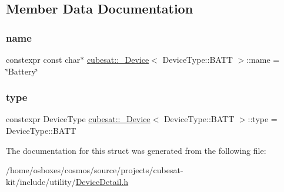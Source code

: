 \subsection{Member Data Documentation}
\mbox{\label{structcubesat_1_1__Device_3_01DeviceType_1_1BATT_01_4_a5faa38b56c60e03d8b60cb86746978fc}} 
\subsubsection{\texorpdfstring{name}{name}}
{\footnotesize\ttfamily constexpr const char$\ast$ \hyperlink{structcubesat_1_1__Device}{cubesat\+::\+\_\+\+Device}$<$ Device\+Type\+::\+B\+A\+TT $>$\+::name = \char`\"{}Battery\char`\"{}\hspace{0.3cm}{\ttfamily [static]}}

\mbox{\label{structcubesat_1_1__Device_3_01DeviceType_1_1BATT_01_4_a7ae61836978dd09725fad423b520021e}} 
\subsubsection{\texorpdfstring{type}{type}}
{\footnotesize\ttfamily constexpr Device\+Type \hyperlink{structcubesat_1_1__Device}{cubesat\+::\+\_\+\+Device}$<$ Device\+Type\+::\+B\+A\+TT $>$\+::type = Device\+Type\+::\+B\+A\+TT\hspace{0.3cm}{\ttfamily [static]}}



The documentation for this struct was generated from the following file\+:\begin{DoxyCompactItemize}
\item 
/home/osboxes/cosmos/source/projects/cubesat-\/kit/include/utility/\hyperlink{DeviceDetail_8h}{Device\+Detail.\+h}\end{DoxyCompactItemize}
